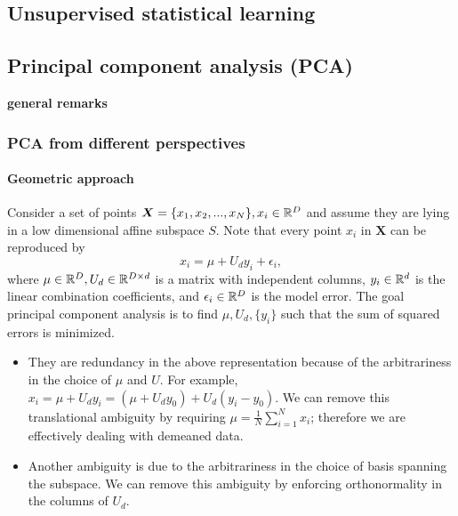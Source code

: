 \begin{refsection}
\startcontents[chapters]	
\chapter{Unsupervised statistical learning}

\section{Principal component analysis (PCA)}\label{ch:statistical-learning:sec:PCA}
\begin{mdframed}
\textbf{general remarks}\\

\end{mdframed}

\subsection{PCA from different perspectives}
\subsubsection{Geometric approach}

\begin{definition}\cite[19]{ma2002generalized}
Consider a set of points $\bm{X}=\{x_1,x_2,...,x_N\},x_i\in \mathbb{R}^D$ and assume they are lying in a low dimensional affine subspace $S$. Note that every point $x_i$ in $\bm{X}$ can be reproduced by
$$x_i = \mu + U_d y_i + \epsilon_i,$$
where $\mu \in \mathbb{R}^D, U_d \in \mathbb{R}^{D\times d}$ is a matrix with independent columns, $y_i \in \mathbb{R}^d$ is the linear combination coefficients, and $\epsilon_i\in \mathbb{R}^D$ is the model error. 
The goal principal component analysis is to find $\mu,U_d,\{y_i\}$ such that the sum of squared errors is minimized.
\end{definition}

\begin{remark}\cite[19]{ma2002generalized}\hfill
\begin{itemize}
	\item They are redundancy in the above representation because of the arbitrariness in the choice of $\mu$ and $U$. For example, $x_i = \mu + U_dy_i = (\mu + U_dy_0) + U_d(y_i - y_0)$. We can remove this translational ambiguity by requiring $\mu = \frac{1}{N}\sum_{i=1}^N x_i$; therefore we are effectively dealing with demeaned data. 
	\item Another ambiguity is due to the arbitrariness in the choice of basis spanning the subspace. We can remove this ambiguity by enforcing orthonormality in the columns of $U_d$. 
\end{itemize}	
\end{remark}




\end{refsection}
